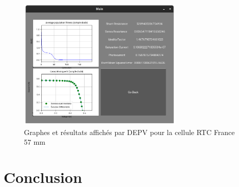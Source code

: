 \begin{figure}[H]
  \begin{center}
    \includegraphics[width=0.7\textwidth]{resources/reswindow.png}
    \caption{Graphes et résultats affichés par DEPV pour la cellule RTC France 57 mm}
    \label{fig:depvres}
  \end{center}
\end{figure}

\section{Conclusion}
